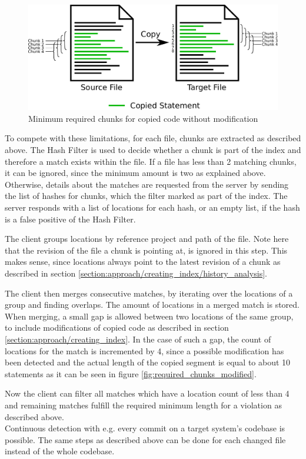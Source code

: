 \begin{figure}[h]
	\centering
	\includegraphics[width=0.9\linewidth]{figures/required_chunks.pdf}
	\caption{Minimum required chunks for copied code without modification}\label{fig:required_chunks}
\end{figure}

To compete with these limitations, for each file, chunks are extracted as described above.
The Hash Filter is used to decide whether a chunk is part of the index and therefore a match exists within the file.
If a file has less than 2 matching chunks, it can be ignored, since the minimum amount is two as explained above.
Otherwise, details about the matches are requested from the server by sending the list of hashes for chunks, which the filter marked as part of the index.
The server responds with a list of locations for each hash, or an empty list, if the hash is a false positive of the Hash Filter.

The client groups locations by reference project and path of the file.
Note here that the revision of the file a chunk is pointing at, is ignored in this step.
This makes sense, since locations always point to the latest revision of a chunk as described in section \ref{section:approach/creating_index/history_analysis}.

The client then merges consecutive matches, by iterating over the locations of a group and finding overlaps.
The amount of locations in a merged match is stored.
When merging, a small gap is allowed between two locations of the same group, to include modifications of copied code as described in section \ref{section:approach/creating_index}.
In the case of such a gap, the count of locations for the match is incremented by 4, since a possible modification has been detected and the actual length of the copied segment is equal to about 10 statements as it can be seen in figure \ref{fig:required_chunks_modified}.

Now the client can filter all matches which have a location count of less than 4 and remaining matches fulfill the required minimum length for a violation as described above.
\\
Continuous detection with e.g. every commit on a target system's codebase is possible.
The same steps as described above can be done for each changed file instead of the whole codebase.
